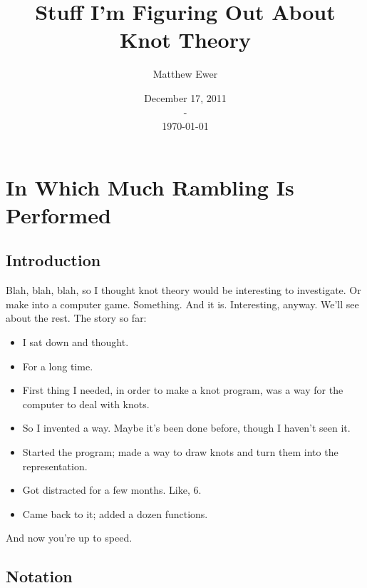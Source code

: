 \documentclass[twoside]{report}
\title{Stuff I'm Figuring Out About Knot Theory}
\author{Matthew Ewer}
\date{December 17, 2011\\-\\\today}
\begin{document}
\maketitle
\tableofcontents

\chapter{In Which Much Rambling Is Performed}

\section{Introduction}

Blah, blah, blah, so I thought knot theory would be interesting to investigate.  Or make into a computer game.  Something.  And it is.  Interesting, anyway.  We'll see about the rest.  The story so far:
\begin{itemize}
\item I sat down and thought.
\item For a long time.
\item First thing I needed, in order to make a knot program, was a way for the computer to deal with knots.
\item So I invented a way.  Maybe it's been done before, though I haven't seen it.
\item Started the program; made a way to draw knots and turn them into the representation.
\item Got distracted for a few months.  Like, 6.
\item Came back to it; added a dozen functions.
\end{itemize}
And now you're up to speed.

\section{Notation}
\end{document}
